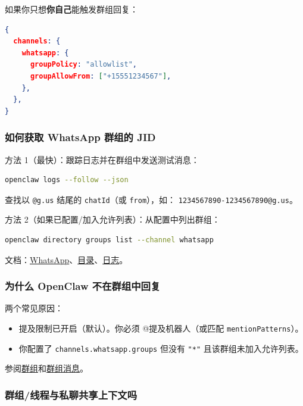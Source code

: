 如果你只想\textbf{你自己}能触发群组回复：

\begin{lstlisting}[language=json]
{
  channels: {
    whatsapp: {
      groupPolicy: "allowlist",
      groupAllowFrom: ["+15551234567"],
    },
  },
}
\end{lstlisting}


\subsubsection{如何获取 WhatsApp 群组的 JID}


方法 1（最快）：跟踪日志并在群组中发送测试消息：

\begin{lstlisting}[language=bash]
openclaw logs --follow --json
\end{lstlisting}


查找以 \texttt{@g.us} 结尾的 \texttt{chatId}（或 \texttt{from}），如：
\texttt{1234567890-1234567890@g.us}。

方法 2（如果已配置/加入允许列表）：从配置中列出群组：

\begin{lstlisting}[language=bash]
openclaw directory groups list --channel whatsapp
\end{lstlisting}


文档：\href{/channels/whatsapp}{WhatsApp}、\href{/cli/directory}{目录}、\href{/cli/logs}{日志}。

\subsubsection{为什么 OpenClaw 不在群组中回复}


两个常见原因：

\begin{itemize}
  \item 提及限制已开启（默认）。你必须 @提及机器人（或匹配 \texttt{mentionPatterns}）。
  \item 你配置了 \texttt{channels.whatsapp.groups} 但没有 \texttt{"*"} 且该群组未加入允许列表。
\end{itemize}


参阅\href{/channels/groups}{群组}和\href{/channels/group-messages}{群组消息}。

\subsubsection{群组/线程与私聊共享上下文吗}


